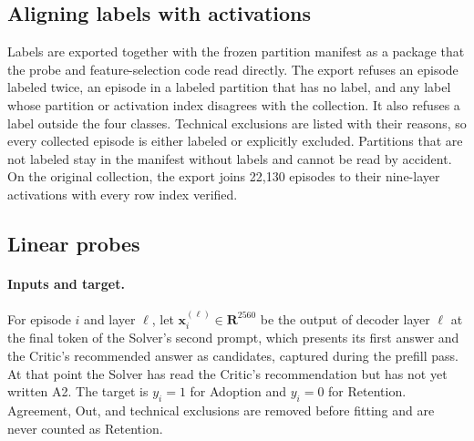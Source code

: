 \subsection{Aligning labels with activations}
\label{sec:method-alignment}

Labels are exported together with the frozen partition manifest as a
package that the probe and feature-selection code read directly. The export
refuses an episode labeled twice, an episode in a labeled partition that has
no label, and any label whose partition or activation index disagrees with
the collection. It also refuses a label outside the four classes. Technical
exclusions are listed with their reasons, so every collected episode is
either labeled or explicitly excluded. Partitions that are not labeled stay
in the manifest without labels and cannot be read by accident. On the
original collection, the export joins 22,130 episodes to their nine-layer
activations with every row index verified.

\subsection{Linear probes}
\label{sec:method-probes}

\paragraph{Inputs and target.} For episode $i$ and layer $\ell$, let
$\mathbf{x}_i^{(\ell)} \in \mathbf{R}^{2560}$ be the output of decoder layer
$\ell$ at the final token of the Solver's second prompt, which presents its first
answer and the Critic's recommended answer as candidates, captured during the
prefill pass. At that point the Solver has read the Critic's recommendation but
has not yet written A2. The target is $y_i = 1$ for Adoption and $y_i = 0$ for
Retention. Agreement, Out, and technical exclusions are removed before fitting
and are never counted as Retention.

